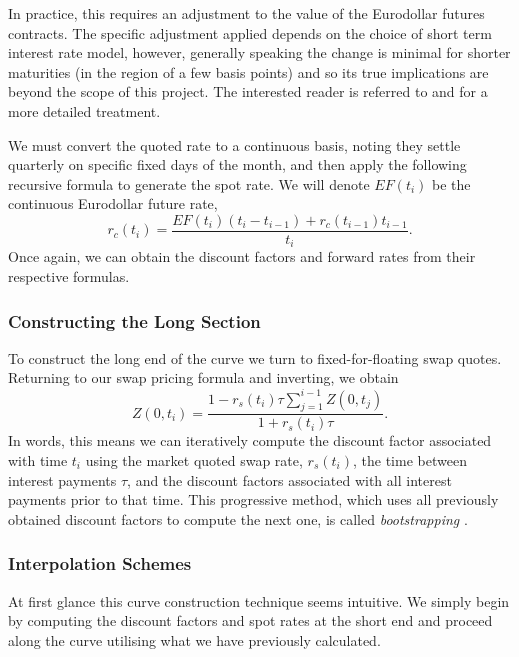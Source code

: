 In practice, this requires an adjustment to the value of the Eurodollar futures contracts. The specific adjustment applied depends on the choice of short term interest rate model, however, generally speaking the change is minimal for shorter maturities (in the region of a few basis points) and so its true implications are beyond the scope of this project. The interested reader is referred to \cite{hull2003options} and \cite{piterbarg2004eurodollar} for a more detailed treatment.

We must convert the quoted rate to a continuous basis, noting they settle quarterly on specific fixed days of the month, and then apply the following recursive formula to generate the spot rate. We will denote $EF(t_i)$ be the continuous Eurodollar future rate,
\begin{equation}
    r_c(t_i) = \frac{EF(t_i) (t_i - t_{i-1}) + r_c(t_{i-1}) t_{i-1}}{t_i}.
\end{equation}
Once again, we can obtain the discount factors and forward rates from their respective formulas. 

\subsubsection{Constructing the Long Section}
To construct the long end of the curve we turn to fixed-for-floating swap quotes. Returning to our swap pricing formula and inverting, we obtain
\begin{equation}
    Z(0,t_i) = \frac{1 - r_s(t_i) \tau \sum_{j=1}^{i-1} Z(0,t_j)}{1 + r_s(t_i) \tau}.
\end{equation}
In words, this means we can iteratively compute the discount factor associated with time $t_i$ using the market quoted swap rate, $r_s(t_i)$, the time between interest payments $\tau$, and the discount factors associated with all interest payments prior to that time. This progressive method, which uses all previously obtained discount factors to compute the next one, is called \textit{bootstrapping} \citep{wilmott2013paul} \citep{veronesi2016handbook}.

\subsubsection{Interpolation Schemes}
At first glance this curve construction technique seems intuitive. We simply begin by computing the discount factors and spot rates at the short end and proceed along the curve utilising what we have previously calculated. 

